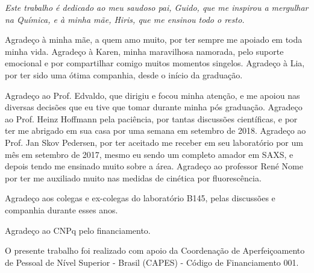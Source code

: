 \documentclass[
	12pt,				%
	oneside,
	a4paper,			%
	english,			%
	brazil%
	]{abntex2}
\begin{document}
\begin{folhadeaprovacao}
%
%      

%	
  
\end{folhadeaprovacao}

\begin{dedicatoria}
   \vspace*{\fill}
   \centering
   \noindent
   \textit{
   	Este trabalho é dedicado ao meu saudoso pai, Guido, que me inspirou a mergulhar na Química, e à minha mãe, Hiris, que me ensinou todo o resto.   
} \vspace*{\fill}
\end{dedicatoria}

\begin{agradecimentos}

Agradeço à minha mãe, a quem amo muito, por ter sempre me apoiado em toda minha vida. Agradeço à Karen, minha maravilhosa namorada, pelo suporte emocional e por compartilhar comigo muitos momentos singelos. Agradeço à Lia, por ter sido uma ótima companhia, desde o início da graduação.

Agradeço ao Prof. Edvaldo, que dirigiu e focou minha atenção, e me apoiou nas diversas decisões que eu tive que tomar durante minha pós graduação. Agradeço ao Prof. Heinz Hoffmann pela paciência, por tantas discussões científicas, e por ter me abrigado em sua casa por uma semana em setembro de 2018. Agradeço ao Prof. Jan Skov Pedersen, por ter aceitado me receber em seu laboratório por um mês em setembro de 2017, mesmo eu sendo um completo amador em SAXS, e depois tendo me ensinado muito sobre a área. Agradeço ao professor René Nome por ter me auxiliado muito nas medidas de cinética por fluorescência.

Agradeço aos colegas e ex-colegas do laboratório B145, pelas discussões e companhia durante esses anos.

Agradeço ao CNPq pelo financiamento.

O presente trabalho foi realizado com apoio da Coordenação de Aperfeiçoamento de Pessoal de Nível Superior - Brasil (CAPES) - Código de Financiamento 001.

\end{agradecimentos}
\end{document}

